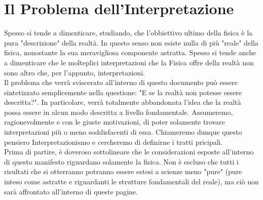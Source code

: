 \documentclass[]{article}
\begin{document}
	\section{Il Problema dell'Interpretazione}
	Spesso si tende a dimenticare, studiando, che l'obbiettivo ultimo della fisica è la pura "descrizione" della realtà. In questo senso non esiste nulla di più "reale" della fisica, nonostante la sua meravigliosa componente astratta. Spesso si tende anche a dimenticare che le molteplici interpretazioni che la Fisica offre della realtà non sono altro che, per l'appunto, interpretazioni.  
	\\
	Il problema che verrà sviscerato all'interno di questo documento può essere sintetizzato semplicemente nella questione: "E se la realtà non potesse essere descritta?". In particolare, verrà totalmente abbandonata l'idea che la realtà possa essere in alcun modo descritta a livello fondamentale. Assumeremo, ragionevolmente e con le giuste motivazioni, di poter solamente trovare interpretazioni più o meno soddisfacenti di essa. Chiameremo dunque questo pensiero Interpretazionismo e cercheremo di definirne i tratti pricipali.\\
		Prima di partire, è doveroso sottolineare che le considerazioni esposte all'interno di questo manifesto riguardano solamente la fisica. Non è escluso che tutti i risultati che si otterranno potranno essere estesi a scienze meno "pure" (pure inteso come astratte e riguardanti le strutture fondamentali del reale), ma ciò non sarà affrontato all'interno di queste pagine. 
\end{document}
